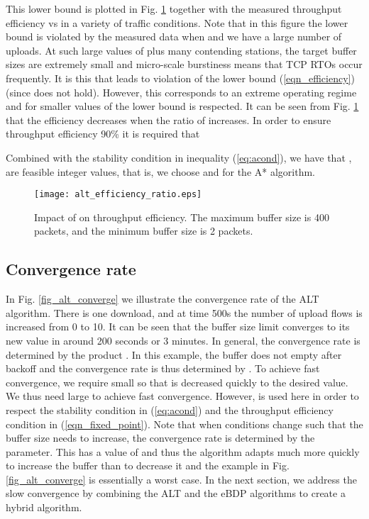 \documentclass[10pt,twocolumn, journal]{IEEEtran}
\def\DLaddition#1{\noindent\ {\color{black} #1}}
\begin{document}
This lower bound is plotted in Fig. \ref{fig_alt_efficiency} together with the measured throughput
efficiency vs  in a variety of traffic conditions. Note that in this figure the lower bound is violated by the measured data when  and we have a large number of uploads.   At such large values of  plus many contending stations, the target buffer sizes are extremely small and micro-scale burstiness means that TCP RTOs occur frequently.  It is this that
leads to violation of the lower bound (\ref{eqn_efficiency})\DLaddition{(since  does not hold)}.  However, this corresponds to an
extreme operating regime and for smaller values of  the lower bound is
respected.   It can be seen from Fig. \ref{fig_alt_efficiency} that the
efficiency decreases when the ratio of  increases. In order to ensure throughput
efficiency  90\% it is required that

Combined with the stability condition in inequality (\ref{eq:acond}),
we have that ,  are feasible integer values, that is, we choose  and  for the A* algorithm.

\begin{figure}[tb]
   \centering
   \texttt{[image: alt\_efficiency\_ratio.eps]}
   \caption{Impact of  on throughput efficiency. The maximum buffer size is 400
   packets, and the minimum buffer size is 2 packets. }
   \label{fig_alt_efficiency}
\end{figure}


\subsection{Convergence rate}\label{subsec_convergence_rate}

In Fig. \ref{fig_alt_converge} we illustrate the convergence rate of the ALT algorithm.
There is one download, and at time 500s the number of upload flows is increased from 0 to
10. It can be seen that the buffer size limit converges to its new value in around 200
seconds or 3 minutes. In general, the convergence rate is determined by the product
. In this example, the buffer does not empty after
backoff and the convergence rate is thus determined by
. To achieve fast convergence, we
require small  so that  is decreased quickly to
the desired value. We thus need large  to achieve fast convergence. However,  is
used here in order to respect the stability condition in (\ref{eq:acond}) and the throughput efficiency condition in (\ref{eqn_fixed_point}).  Note that
when conditions change such that the buffer size needs to increase, the convergence rate
is determined by the  parameter.  This has a value of  and thus the algorithm
adapts much more quickly to increase the buffer than to decrease it and the example in
Fig. \ref{fig_alt_converge} is essentially a worst case.  In the next section, we address
the slow convergence by combining the ALT and the eBDP algorithms to create a hybrid algorithm.
\end{document}
